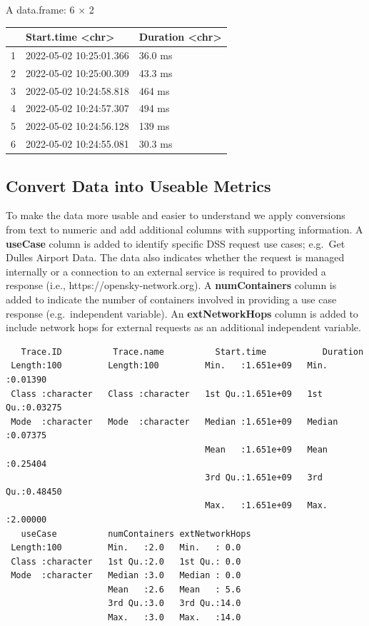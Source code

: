 \documentclass[
  letterpaper,
  DIV=11,
  numbers=noendperiod]{scrartcl}
\begin{document}
A data.frame: 6 × 2

\begin{longtable}[]{@{}lll@{}}
\toprule()
& Start.time \textless chr\textgreater{} & Duration
\textless chr\textgreater{} \\
\midrule()
\endhead
1 & 2022-05-02 10:25:01.366 & 36.0 ms \\
2 & 2022-05-02 10:25:00.309 & 43.3 ms \\
3 & 2022-05-02 10:24:58.818 & 464 ms \\
4 & 2022-05-02 10:24:57.307 & 494 ms \\
5 & 2022-05-02 10:24:56.128 & 139 ms \\
6 & 2022-05-02 10:24:55.081 & 30.3 ms \\
\bottomrule()
\end{longtable}

\hypertarget{convert-data-into-useable-metrics}{%
\subsection{Convert Data into Useable
Metrics}\label{convert-data-into-useable-metrics}}

To make the data more usable and easier to understand we apply
conversions from text to numeric and add additional columns with
supporting information. A \textbf{useCase} column is added to identify
specific DSS request use cases; e.g.~Get Dulles Airport Data. The data
also indicates whether the request is managed internally or a connection
to an external service is required to provided a response (i.e.,
https://opensky-network.org). A \textbf{numContainers} column is added
to indicate the number of containers involved in providing a use case
response (e.g.~independent variable). An \textbf{extNetworkHops} column
is added to include network hops for external requests as an additional
independent variable.

\begin{verbatim}
   Trace.ID          Trace.name          Start.time           Duration      
 Length:100         Length:100         Min.   :1.651e+09   Min.   :0.01390  
 Class :character   Class :character   1st Qu.:1.651e+09   1st Qu.:0.03275  
 Mode  :character   Mode  :character   Median :1.651e+09   Median :0.07375  
                                       Mean   :1.651e+09   Mean   :0.25404  
                                       3rd Qu.:1.651e+09   3rd Qu.:0.48450  
                                       Max.   :1.651e+09   Max.   :2.00000  
   useCase          numContainers extNetworkHops
 Length:100         Min.   :2.0   Min.   : 0.0  
 Class :character   1st Qu.:2.0   1st Qu.: 0.0  
 Mode  :character   Median :3.0   Median : 0.0  
                    Mean   :2.6   Mean   : 5.6  
                    3rd Qu.:3.0   3rd Qu.:14.0  
                    Max.   :3.0   Max.   :14.0  
\end{verbatim}
\end{document}

